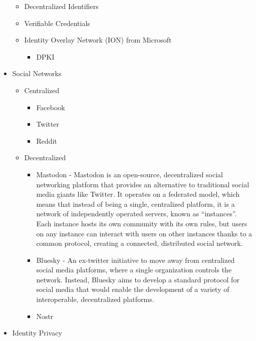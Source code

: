 \begin{itemize}
  \begin{itemize}
  \tightlist
  \item
    Decentralized Identifiers
  \item
    Verifiable Credentials
  \item
    Identity Overlay Network (ION) from Microsoft

    \begin{itemize}
    \tightlist
    \item
      DPKI
    \end{itemize}
  \end{itemize}
\item
  Social Networks

  \begin{itemize}
  \tightlist
  \item
    Centralized

    \begin{itemize}
    \tightlist
    \item
      Facebook
    \item
      Twitter
    \item
      Reddit
    \end{itemize}
  \item
    Decentralized

    \begin{itemize}
    \tightlist
    \item
      Mastodon - Mastodon is an open-source, decentralized social networking platform that provides an alternative to traditional social media giants like Twitter. It operates on a federated model, which means that instead of being a single, centralized platform, it is a network of independently operated servers, known as ``instances''. Each instance hosts its own community with its own rules, but users on any instance can interact with users on other instances thanks to a common protocol, creating a connected, distributed social network.
    \item
      Bluesky - An ex-twitter initiative to move away from centralized social media platforms, where a single organization controls the network. Instead, Bluesky aims to develop a standard protocol for social media that would enable the development of a variety of interoperable, decentralized platforms.
    \item
      Nostr
    \end{itemize}
  \end{itemize}
\item
  Identity Privacy
\end{itemize}

